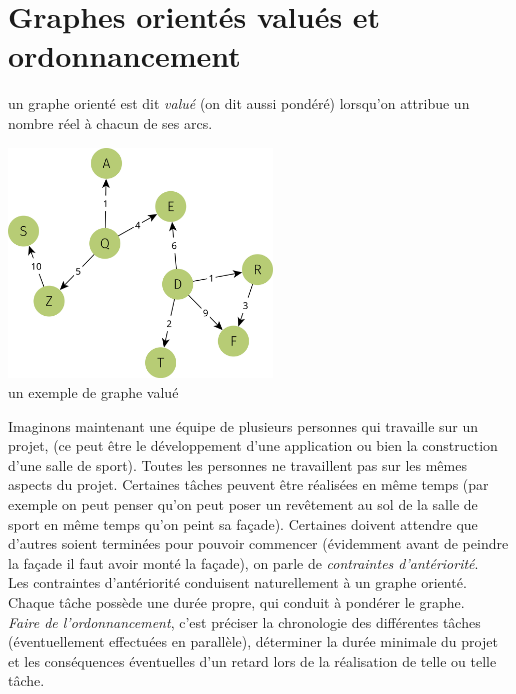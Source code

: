 \section{Graphes orientés valués et ordonnancement}


\begin{definition}
    un graphe orienté est dit \textit{valué} (on dit aussi pondéré) lorsqu'on attribue un nombre réel à chacun de ses arcs.
    \begin{center}
        \includegraphics[width=7cm]{graphes2/img/graphe_value.png}\\un exemple de graphe valué
    \end{center}
\end{definition}

Imaginons maintenant une équipe de plusieurs personnes qui travaille sur un projet, (ce peut être le développement d'une application ou bien la construction d'une salle de sport). Toutes les personnes ne travaillent pas sur les mêmes aspects du projet. Certaines tâches peuvent être réalisées en même temps (par exemple on peut penser qu'on peut poser un revêtement au sol de la salle de sport en même temps qu'on peint sa façade). Certaines doivent attendre que d'autres soient terminées pour pouvoir commencer (évidemment avant de peindre la façade il faut avoir monté la façade), on parle de \textit{contraintes d'antériorité}.\\
Les contraintes d'antériorité conduisent naturellement à un graphe orienté. Chaque tâche possède une durée propre, qui conduit à pondérer le graphe.\\

\textit{Faire de l'ordonnancement}, c'est préciser la chronologie des différentes tâches (éventuellement effectuées en parallèle), déterminer la durée minimale du projet et les conséquences éventuelles d'un retard lors de la réalisation de telle ou telle tâche.

